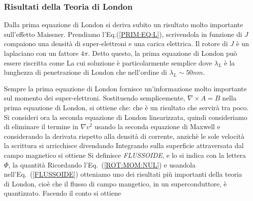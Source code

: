 \subsubsection{Risultati della Teoria di London}
Dalla prima equazione di London si deriva subito un risultato molto importante sull'effetto Maissner. Prendiamo l'Eq.(\ref{PRIM:EQ:L}), scrivendola in funzione di $J$ compaiono una densit\`a di super-elettroni e una carica elettrica. Il rotore di $J$ \`e un laplaciano con un fattore $4\pi$. Detto questo, la prima equazione di London pu\`o essere riscritta come
La cui soluzione \`e particolarmente semplice
dove $\lambda_L$ \`e la lunghezza di penetrazione di London che nell'ordine di $\lambda_L\sim50nm$.

Sempre la prima equazione di London fornisce un'informazione molto importante sul momento dei super-elettroni. Sostituendo semplicemente, $\nabla \times A = B$ nella prima equazione di London, si ottiene che:
che \`e un risultato che servir\`a tra poco.
Si consideri ora la seconda equazione di London linearizzata, quindi consideriamo di eliminare il termine in $\nabla v^2$
usando la seconda equazione di Maxwell e considerando la derivata rispetto alla densit\`a di corrente, anzich\`e le sole velocit\`a la scrittura si arricchisce divendando
Integrando sulla superficie attraversata dal campo magnetico si ottiene
Si definisce \textit{FLUSSOIDE}, e lo si indica con la lettera $\Phi$, la quantit\`a
Ricordando l'Eq.~(\ref{ROT:MOM:NUL}) e usandola nell'Eq.~(\ref{FLUSSOIDE}) otteniamo uno dei risultati pi\`u importanti della teoria di London, cio\`e che il flusso di campo mangetico, in un superconduttore, \`e quantizzato. Facendo il conto si ottiene
